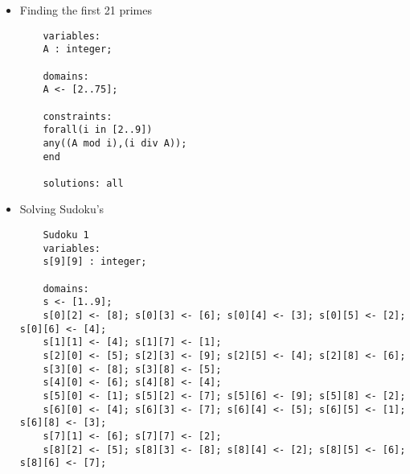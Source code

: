 \documentclass{article}
\begin{document}
\begin{itemize}
\begin{lstlisting}
	solutions: all 
	
	UN + UN + NEUF = ONZE
	variables:
	U,N,E,F,O,Z : integer;
	X1, X2, X3 : integer;
	
	domains:
	U,N,E,F, Z <- [0..9];
	O <- [1..9];
	X1, X2 <- [0..2];
	X3 <- [0,1];
	
	constraints:
	alldiff(U,N,E,F,O,Z);
	N + N + F = E + 10 *X1;
	X1 + U + U + U= Z + 10 * X2;
	X2 + E = N + 10 * X3;
	X3 + N = O;
	
	solutions: all 
	
	ONE + ONE + NINE + TWENTY + FIFTY = EIGHTY
	variables:
	O, N, E, I, T, W, Y, F, G, H : integer;
	X1, X2, X3, X4, X5 : integer;
	
	domains:
	I, W, G, H <- [0..9];
	O, N, T, F, E <- [1..9]; 
	Y <- [0,2,4,6,8]; 
	X1, X2 <- [1,2];
	X3 <- [0..3];
	X4 <- [0..2];
	X5 <- [1];
	
	constraints:
	W + F + X4 > 10;
	alldiff(O, N, E, I, T, W, Y, F, G, H);
	E + E + Y =10 *X1;
	X1 + N + N + T= 10 * X2;
	X2 + O + I + N + F = H + 10 * X3;
	X3 + N + E + I = G + 10 * X4;
	X4 + W + F = I + 10 * X5;
	X5 + T = E;
	
	solutions: all 
	
	I + GUESS + THE + TRUTH = HURTS
	variables:
	I, G, U, E, S, T, H, R : integer;
	X1, X2, X3, X4 : integer;
	
	domains:
	U, E, S, R <- [0..9];
	I, G, T, H <- [1..9];
	X1 <- [0..3];
	X2, X3 <- [0..2];
	X4 <- [0..1];
	
	constraints:
	alldiff(I, G, U, E, S, T, H, R);
	I + S + E + H = S + 10 * X1;
	X1 + S + H + T = T + 10 * X2;
	X2 + E + T + U = R + 10 * X3;
	X3 + U + R = U + 10 * X4;
	X4 + G + T = H;
	
	solutions: all 
	\end{lstlisting}
	
	\item Finding the first 21 primes
	\begin{lstlisting}
	variables:
	A : integer;
	
	domains:
	A <- [2..75];
	
	constraints:
	forall(i in [2..9])
	any((A mod i),(i div A)); 
	end
	
	solutions: all 
	\end{lstlisting}
	
	\item Solving Sudoku's
	\begin{lstlisting}
	Sudoku 1	
	variables:
	s[9][9] : integer;
	
	domains:
	s <- [1..9];
	s[0][2] <- [8]; s[0][3] <- [6]; s[0][4] <- [3]; s[0][5] <- [2]; s[0][6] <- [4];
	s[1][1] <- [4]; s[1][7] <- [1];
	s[2][0] <- [5]; s[2][3] <- [9]; s[2][5] <- [4]; s[2][8] <- [6];
	s[3][0] <- [8]; s[3][8] <- [5];
	s[4][0] <- [6]; s[4][8] <- [4];
	s[5][0] <- [1]; s[5][2] <- [7]; s[5][6] <- [9]; s[5][8] <- [2];
	s[6][0] <- [4]; s[6][3] <- [7]; s[6][4] <- [5]; s[6][5] <- [1]; s[6][8] <- [3];
	s[7][1] <- [6]; s[7][7] <- [2];
	s[8][2] <- [5]; s[8][3] <- [8]; s[8][4] <- [2]; s[8][5] <- [6]; s[8][6] <- [7];
	

\end{lstlisting}
\end{itemize}
\end{document}
